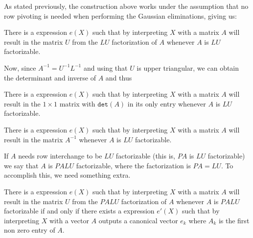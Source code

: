 As stated previously, the construction above works under the assumption that no row pivoting is needed when performing the Gaussian eliminations, giving us:
\begin{proposition}\label{prop:gauss}
There is a \langfor expression $e(X)$ such that by interpreting $X$ with a matrix $A$ will result in the matrix $U$ from the $LU$ factorization of $A$ whenever $A$ is $LU$ factorizable.
\end{proposition}

Now, since $A^{-1}=U^{-1}L^{-1}$ and using that $U$ is upper triangular, we can obtain the determinant and inverse of $A$ and thus




 \begin{proposition}\label{prop:determinant}
There is a \langfor expression $e(X)$ such that by interpreting $X$ with a matrix $A$ will result in the $1\times 1$ matrix with $\texttt{det}(A)$ in its only entry whenever $A$ is $LU$ factorizable.
\end{proposition}

\begin{proposition}\label{prop:inverse}
There is a \langfor expression $e(X)$ such that by interpreting $X$ with a matrix $A$ will result in the matrix $A^{-1}$ whenever $A$ is $LU$ factorizable.
\end{proposition}

If $A$ needs row interchange to be $LU$ factorizable (this is, $PA$ is $LU$ factorizable) we say that $A$ is $PALU$ factorizable, where the factorization is $PA=LU$. To accomplish this, we need something extra.

 \begin{proposition}\label{prop:palu}
There is a \langfor expression $e(X)$ such that by interpreting $X$ with a matrix $A$ will result in the matrix $U$ from the $PALU$ factorization of $A$ whenever $A$ is $PALU$ factorizable if and only if there exists a \langfor expression $e'(X)$ such that by interpreting $X$ with a vector $A$ outputs a canonical vector $e_k$ where $A_k$ is the first non zero entry of $A$.
\end{proposition}
